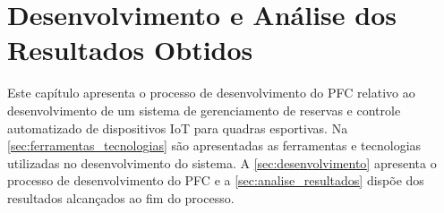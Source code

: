 \chapter{Desenvolvimento e Análise dos Resultados Obtidos}\label{cap:desenvolvimento_e_analise_resultados}
Este capítulo apresenta o processo de desenvolvimento do \acrlong{PFC} relativo ao desenvolvimento de um sistema de gerenciamento de reservas e controle automatizado de dispositivos IoT para quadras esportivas. Na \autoref{sec:ferramentas_tecnologias} são apresentadas as ferramentas e tecnologias utilizadas no desenvolvimento do sistema. A \autoref{sec:desenvolvimento} apresenta o processo de desenvolvimento do PFC e a \autoref{sec:analise_resultados} dispõe dos resultados alcançados ao fim do processo.



